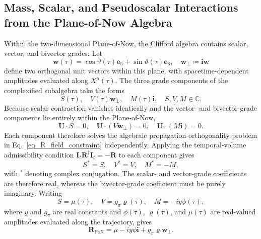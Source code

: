 \subsection{Mass, Scalar, and Pseudoscalar Interactions from the Plane-of-Now Algebra}
Within the two-dimensional Plane-of-Now, the Clifford algebra contains scalar, vector, and bivector grades. Let
\begin{equation}
    \mathbf{w}(\tau) = \cos\vartheta(\tau)\mathbf{e}_{5} + \sin\vartheta(\tau)\mathbf{e}_{6},\quad \mathbf{w}_{\perp}\coloneqq\mathbf{i}\mathbf{w}
\end{equation}
define two orthogonal unit vectors within this plane, with spacetime-dependent amplitudes evaluated along $X^{\mu}(\tau)$. The three grade components of the complexified subalgebra take the forms
\begin{equation}\label{eq_general_plane_now_element}
    S(\tau), \quad V(\tau)\mathbf{w}_{\perp}, \quad M(\tau)\mathbf{i}, \quad S,V,M \in \mathbb{C}.
\end{equation}
Because scalar contraction vanishes identically and the vector- and bivector-grade components lie entirely within the Plane-of-Now,
\begin{equation}
    \mathbf{U}\cdot S = 0, \quad \mathbf{U}\cdot(V\mathbf{w}_{\perp}) = 0, \quad \mathbf{U}\cdot(M\mathbf{i}) = 0.
\end{equation}
Each component therefore solves the algebraic propagation-orthogonality problem in Eq.~\eqref{eq_R_field_constraint} independently. Applying the temporal-volume admissibility condition $\mathbf{I}_{t}\mathbf{R}^{\dagger}\mathbf{I}_{t}=-\mathbf{R}$ to each component gives
\begin{equation}
    S^{*} = S, \quad V^{*} = V, \quad M^{*} = -M,
\end{equation}
with $^{*}$ denoting complex conjugation. The scalar- and vector-grade coefficients are therefore real, whereas the bivector-grade coefficient must be purely imaginary. Writing
\begin{equation}
    S = \mu(\tau), \quad V = g_{\pi}\varrho(\tau), \quad M = -iy\phi(\tau),
\end{equation}
where $y$ and $g_{\pi}$ are real constants and $\phi(\tau)$, $\varrho(\tau)$, and $\mu(\tau)$ are real-valued amplitudes evaluated along the trajectory, gives
\begin{equation}\label{eq_admissible_plane_now_source}
    \mathbf{R}_{\mathrm{PoN}} = \mu - iy\phi\mathbf{i} + g_{\pi}\varrho\mathbf{w}_{\perp}.
\end{equation}

